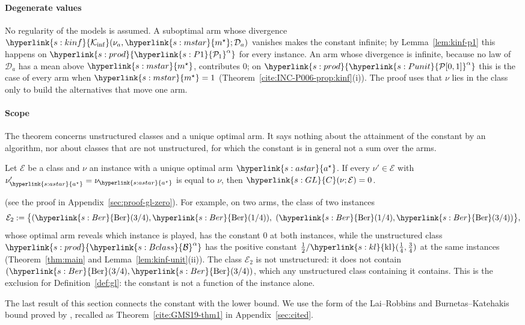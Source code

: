 \documentclass[11pt]{article}
\newcommand{\sy}[2]{{\hyperlink{#1}{#2}}}
\newcommand{\Pone}{\sy{s:P1}{\mathcal{P}_{1}}}
\newcommand{\kl}{\sy{s:kl}{\mathrm{kl}}}
\newcommand{\Ber}{\sy{s:Ber}{\mathrm{Ber}}}
\newcommand{\Kinf}{\sy{s:kinf}{\mathcal{K}_{\inf}}}
\newcommand{\Punit}{\sy{s:Punit}{\mathcal{P}[0,1]}}
\newcommand{\Bclass}{\sy{s:Bclass}{\mathcal{B}}}
\newcommand{\ms}{\sy{s:mstar}{m^{\star}}}
\newcommand{\powc}[1]{\sy{s:prod}{#1^{\alpha}}}
\newcommand{\as}{\sy{s:astar}{a^{\star}}}
\newcommand{\GL}{\sy{s:GL}{C}}
\begin{document}
\paragraph{Degenerate values} No regularity of the models is assumed. A suboptimal arm whose
divergence $\Kinf(\nu_a,\ms;\mathcal D_a)$ vanishes makes the constant infinite; by
Lemma~\ref{lem:kinf-p1} this happens on $\powc{\Pone}$ for every instance. An arm whose divergence is
infinite, because no law of $\mathcal D_a$ has a mean above $\ms$, contributes $0$; on $\powc{\Punit}$
this is the case of every arm when $\ms=1$ (Theorem~\ref{cite:INC-P006-prop:kinf}(i)). The proof uses that $\nu$
lies in the class only to build the alternatives that move one arm.

\paragraph{Scope} The theorem concerns unstructured classes and a unique optimal arm. It says
nothing about the attainment of the constant by an algorithm, nor about classes that are not
unstructured, for which the constant is in general not a sum over the arms.

\begin{proposition}\label{prop:gl-zero}
Let $\mathcal E$ be a class and $\nu$ an instance with a unique optimal arm $\as$. If every
$\nu'\in\mathcal E$ with $\nu'_{\as}=\nu_{\as}$ is equal to $\nu$, then $\GL(\nu;\mathcal E)=0$.
\end{proposition}
(see the proof in Appendix~\ref{sec:proof-gl-zero}). For example, on two arms, the class of two
instances
\begin{equation*}
  \mathcal E_2:=\big\{(\Ber(3/4),\Ber(1/4)),\ (\Ber(1/4),\Ber(3/4))\big\},
\end{equation*}
whose optimal arm reveals which instance is played, has the constant $0$ at both instances, while
the unstructured class $\powc{\Bclass}$ has the positive constant $\frac12/\kl(\frac14,\frac34)$ at the
same instances (Theorem~\ref{thm:main} and Lemma~\ref{lem:kinf-unit}(ii)). The class $\mathcal E_2$ is
not unstructured: it does not contain $(\Ber(3/4),\Ber(3/4))$, which any unstructured class containing
it contains. This is the exclusion for
Definition~\ref{def:gl}: the constant is not a function of the instance alone.

The last result of this section connects the constant with the lower bound. We use the form of
the Lai--Robbins and Burnetas--Katehakis bound proved by \citet[Theorem~1]{GMS19}, recalled as
Theorem~\ref{cite:GMS19-thm1} in Appendix~\ref{sec:cited}.
\end{document}
